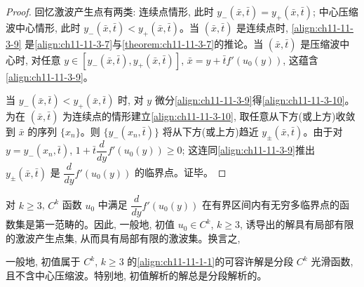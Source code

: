 \documentclass[../../main.tex]{subfiles}
\begin{document}
\begin{proof}
回忆激波产生点有两类: 连续点情形, 此时 $y_-(\bar x,\bar t)=y_+(\bar x,\bar t)$; 中心压缩波中心情形, 此时 $y_-(\bar x,\bar t)<y_+(\bar x,\bar t)$。当 $(\bar x,\bar t)$ 是连续点时, \eqref{align:ch11-11-3-9} 是\eqref{align:ch11-11-3-7}与\cref{theorem:ch11-11-3-7}的推论。当 $(\bar x,\bar t)$ 是压缩波中心时, 对任意 $y\in[y_-(\bar x,\bar t),y_+(\bar x,\bar t)]$, $\bar x=y+\bar t f'(u_0(y))$, 这蕴含\eqref{align:ch11-11-3-9}。

当 $y_-(\bar x,\bar t)<y_+(\bar x,\bar t)$ 时, 对 $y$ 微分\eqref{align:ch11-11-3-9}得\eqref{align:ch11-11-3-10}。为在 $(\bar x,\bar t)$ 为连续点的情形建立\eqref{align:ch11-11-3-10}, 取任意从下方(或上方)收敛到 $\bar x$ 的序列 $\{x_n\}$。则 $\{y_-(x_n,\bar t)\}$ 将从下方(或上方)趋近 $y_\pm(\bar x,\bar t)$。由于对 $y=y_-(x_n,\bar t)$, $1+\bar t\dfrac{d}{dy}f'(u_0(y))\geqslant0$; 这连同\eqref{align:ch11-11-3-9}推出 $y_\pm(\bar x,\bar t)$ 是 $\dfrac{d}{dy}f'(u_0(y))$ 的临界点。证毕。
\end{proof}

对 $k\geqslant3$, $C^k$ 函数 $u_0$ 中满足 $\dfrac{d}{dy}f'(u_0(y))$ 在有界区间内有无穷多临界点的函数集是第一范畴的。因此, 一般地, 初值 $u_0\in C^k$, $k\geqslant3$, 诱导出的解具有局部有限的激波产生点集, 从而具有局部有限的激波集。换言之,

\begin{theorem}\label{theorem:ch11-11-3-10}
一般地, 初值属于 $C^k$, $k\geqslant3$ 的\eqref{align:ch11-11-1-1}的可容许解是分段 $C^k$ 光滑函数, 且不含中心压缩波。特别地, 初值解析的解总是分段解析的。
\end{theorem}
\end{document}
